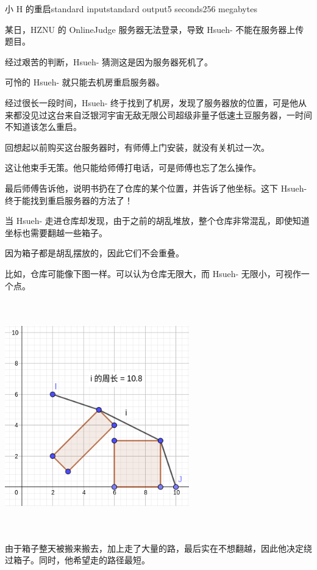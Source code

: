 \begin{problem}{小 H 的重启}{standard input}{standard output}{5 seconds}{256 megabytes}

某日，HZNU 的 OnlineJudge 服务器无法登录，导致 Hsueh- 不能在服务器上传题目。

经过艰苦的判断，Hsueh- 猜测这是因为服务器死机了。

可怜的 Hsueh- 就只能去机房重启服务器。

经过很长一段时间，Hsueh- 终于找到了机房，发现了服务器放的位置，可是他从来都没见过这台来自泛银河宇宙无敌无限公司超级非量子低速土豆服务器，一时间不知道该怎么重启。

回想起以前购买这台服务器时，有师傅上门安装，就没有关机过一次。

这让他束手无策。他只能给师傅打电话，可是师傅也忘了怎么操作。

最后师傅告诉他，说明书扔在了仓库的某个位置，并告诉了他坐标。这下 Hsueh- 终于能找到重启服务器的方法了！

当 Hsueh- 走进仓库却发现，由于之前的胡乱堆放，整个仓库非常混乱，即使知道坐标也需要翻越一些箱子。

因为箱子都是胡乱摆放的，因此它们不会重叠。

比如，仓库可能像下图一样。可以认为仓库无限大，而 Hsueh- 无限小，可视作一个点。

\begin{center}
\includegraphics[width=8cm,height=10cm,natwidth=320,natheight=360]{data1.png} %
\end{center}


由于箱子整天被搬来搬去，加上走了大量的路，最后实在不想翻越，因此他决定绕过箱子。同时，他希望走的路径最短。


\end{problem}
